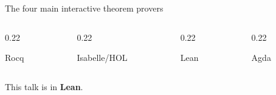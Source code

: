 \documentclass[aspectratio=169,10pt]{beamer}
\newcommand{\jtmeta}{\footnotesize}
\newcommand{\jtstack}[3]{%
  {\color{#1}\fontsize{17}{21}\selectfont\bfseries\raggedright #2\par}
  \ifx\relax#3\relax\else\vspace{5pt}{\jtmeta\color{jtgrey}\raggedright #3\par}\fi}
\begin{document}
\begin{frame}{The four main interactive theorem provers}
  \vfill
  \begin{columns}[T,onlytextwidth]
    \begin{column}{0.22\textwidth}\jtstack{jtgrey}{Rocq}{}\end{column}
    \hfill
    \begin{column}{0.22\textwidth}\jtstack{jtgrey}{Isabelle/\allowbreak HOL}{}\end{column}
    \hfill
    \begin{column}{0.22\textwidth}\jtstack{jttealink}{Lean}{}\end{column}
    \hfill
    \begin{column}{0.22\textwidth}\jtstack{jtgrey}{Agda}{}\end{column}
  \end{columns}

  \vspace{22pt}
  {\color{jtgrey}This talk is in {\bfseries\color{jttealink}Lean}.\par}
  \vfill
\end{frame}
\end{document}
